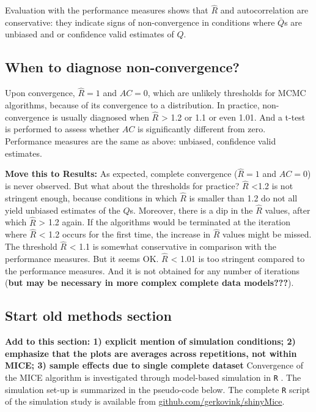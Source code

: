 \documentclass[Royal,times,sageh]{sagej}
\begin{document}
Evaluation with the performance measures shows that \(\widehat{R}\) and
autocorrelation are conservative: they indicate signs of non-convergence
in conditions where \(\bar{Q}\)s are unbiased and or confidence valid
estimates of \(Q\).

\hypertarget{when-to-diagnose-non-convergence}{%
\subsection{When to diagnose
non-convergence?}\label{when-to-diagnose-non-convergence}}

Upon convergence, \(\widehat{R}=1\) and \(AC=0\), which are unlikely
thresholds for MCMC algorithms, because of its convergence to a
distribution. In practice, non-convergence is usually diagnosed when
\(\widehat{R}\) \textgreater{} 1.2 or 1.1 or even 1.01. And a t-test is
performed to assess whether \(AC\) is significantly different from zero.
Performance measures are the same as above: unbiased, confidence valid
estimates.

\textbf{Move this to Results:} As expected, complete convergence
(\(\widehat{R}=1\) and \(AC=0\)) is never observed. But what about the
thresholds for practice? \(\widehat{R}\) \textless1.2 is not stringent
enough, because conditions in which \(\widehat{R}\) is smaller than 1.2
do not all yield unbiased estimates of the \(Q\)s. Moreover, there is a
dip in the \(\widehat{R}\) values, after which \(\widehat{R}\)
\textgreater{} 1.2 again. If the algorithms would be terminated at the
iteration where \(\widehat{R}\) \textless{} 1.2 occurs for the first
time, the increase in \(\widehat{R}\) values might be missed. The
threshold \(\widehat{R}\) \textless{} 1.1 is somewhat conservative in
comparison with the performance measures. But it seems OK.
\(\widehat{R}\) \textless{} 1.01 is too stringent compared to the
performance measures. And it is not obtained for any number of
iterations (\textbf{but may be necessary in more complex complete data
models???}).

\hypertarget{start-old-methods-section}{%
\subsection{Start old methods section}\label{start-old-methods-section}}

\textbf{Add to this section: 1) explicit mention of simulation
conditions; 2) emphasize that the plots are averages across repetitions,
not within MICE; 3) sample effects due to single complete dataset}
Convergence of the MICE algorithm is investigated through model-based
simulation in \texttt{R} \citep[version 3.6.3;][]{R}. The simulation
set-up is summarized in the pseudo-code below. The complete \texttt{R}
script of the simulation study is available from
\href{https://github.com/gerkovink/shinyMice/tree/master/3.Thesis/1.SimulationStudy}{github.com/gerkovink/shinyMice}.
\end{document}
